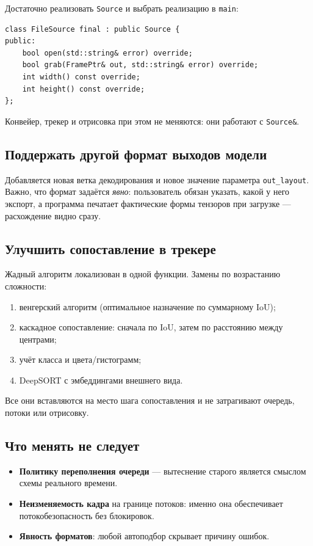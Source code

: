 \documentclass[11pt,a4paper]{article}
\theoremstyle{definition}
\theoremstyle{remark}
\begin{document}
Достаточно реализовать \texttt{Source} и выбрать реализацию в \texttt{main}:

\begin{lstlisting}
class FileSource final : public Source {
public:
    bool open(std::string& error) override;
    bool grab(FramePtr& out, std::string& error) override;
    int width() const override;
    int height() const override;
};
\end{lstlisting}

Конвейер, трекер и отрисовка при этом не меняются: они работают с
\texttt{Source\&}.

\subsection{Поддержать другой формат выходов модели}

Добавляется новая ветка декодирования и новое значение параметра
\texttt{out\_layout}. Важно, что формат задаётся \emph{явно}: пользователь
обязан указать, какой у него экспорт, а программа печатает фактические формы
тензоров при загрузке --- расхождение видно сразу.

\subsection{Улучшить сопоставление в трекере}

Жадный алгоритм локализован в одной функции. Замены по возрастанию сложности:

\begin{enumerate}
  \item венгерский алгоритм (оптимальное назначение по суммарному IoU);
  \item каскадное сопоставление: сначала по IoU, затем по расстоянию между
        центрами;
  \item учёт класса и цвета/гистограмм;
  \item DeepSORT с эмбеддингами внешнего вида.
\end{enumerate}

Все они вставляются на место шага сопоставления и не затрагивают очередь,
потоки или отрисовку.

\subsection{Что менять не следует}

\begin{itemize}
  \item \textbf{Политику переполнения очереди} --- вытеснение старого
        является смыслом схемы реального времени.
  \item \textbf{Неизменяемость кадра} на границе потоков: именно она
        обеспечивает потокобезопасность без блокировок.
  \item \textbf{Явность форматов}: любой автоподбор скрывает причину ошибок.
\end{itemize}
\end{document}
